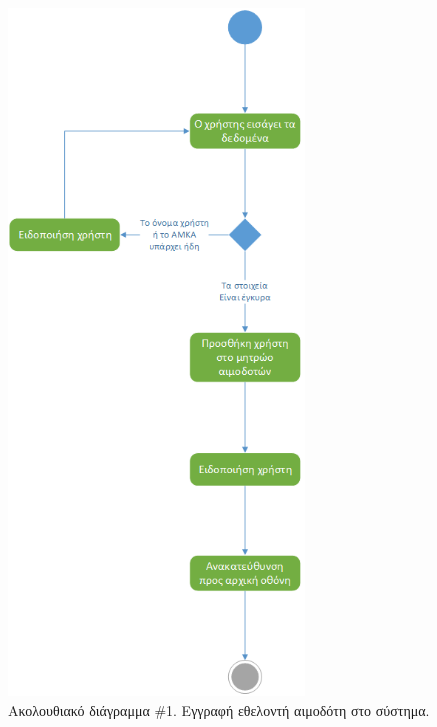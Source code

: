 		
		\begin{figure}[H]
		    \centering
		    \includegraphics[width=0.7\textwidth]{Register.png}
		    \caption{Ακολουθιακό διάγραμμα \#1. Εγγραφή εθελοντή αιμοδότη στο σύστημα.}
		    \label{fig:register}
		\end{figure}
		
